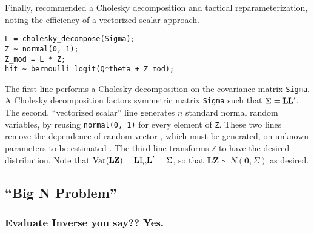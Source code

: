 \documentclass{article}
\begin{document}
Finally, \cite{Carpenter} recommended a Cholesky decomposition and tactical reparameterization, noting the efficiency of a vectorized scalar approach.
\begin{verbatim}
L = cholesky_decompose(Sigma);  
Z ~ normal(0, 1);  
Z_mod = L * Z; 
hit ~ bernoulli_logit(Q*theta + Z_mod);
\end{verbatim}
The first line performs a Cholesky decomposition on the covariance matrix \verb|Sigma|. A Cholesky decomposition factors symmetric matrix \verb|Sigma| such that $\Sigma = \text{\pmb{LL}}'$. The second, ``vectorized scalar'' line generates $n$ standard normal random variables, by reusing \verb|normal(0, 1)| for every element of \verb|Z|. These two lines remove the dependence of random vector , which must be generated, on unknown parameters to be estimated \cite{Trangucci2017}. The third line transforms \verb|Z| to have the desired distribution. Note that $\text{Var}(\text{\pmb{LZ}}) = \text{\pmb{L}} \text{I}_{n}\text{\pmb{L}}' = \Sigma$, so that $\pmb{LZ} \sim N(\pmb{0}, \Sigma)$ as desired.

\subsection{``Big N Problem''}

\subsubsection{Evaluate Inverse you say?? Yes.}
\end{document}
